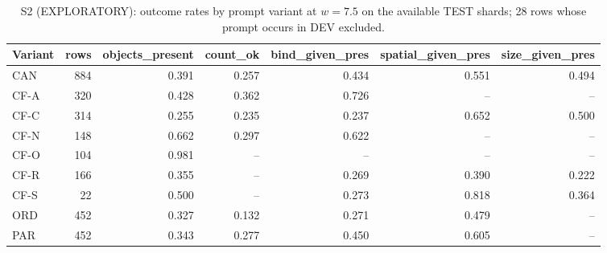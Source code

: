\begin{table}[t]\centering\small
\caption{S2 (EXPLORATORY): outcome rates by prompt variant at $w=7.5$ on the available TEST shards; 28 rows whose prompt occurs in DEV excluded.}\label{tab:partial-s2}
\begin{adjustbox}{max width=\linewidth}
\begin{tabular}{lrrrrrr}
\toprule
Variant & rows & objects\_present & count\_ok & bind\_given\_pres & spatial\_given\_pres & size\_given\_pres \\
\midrule
CAN & 884 & 0.391 & 0.257 & 0.434 & 0.551 & 0.494 \\
CF-A & 320 & 0.428 & 0.362 & 0.726 & -- & -- \\
CF-C & 314 & 0.255 & 0.235 & 0.237 & 0.652 & 0.500 \\
CF-N & 148 & 0.662 & 0.297 & 0.622 & -- & -- \\
CF-O & 104 & 0.981 & -- & -- & -- & -- \\
CF-R & 166 & 0.355 & -- & 0.269 & 0.390 & 0.222 \\
CF-S & 22 & 0.500 & -- & 0.273 & 0.818 & 0.364 \\
ORD & 452 & 0.327 & 0.132 & 0.271 & 0.479 & -- \\
PAR & 452 & 0.343 & 0.277 & 0.450 & 0.605 & -- \\
\bottomrule
\end{tabular}
\end{adjustbox}
\end{table}

